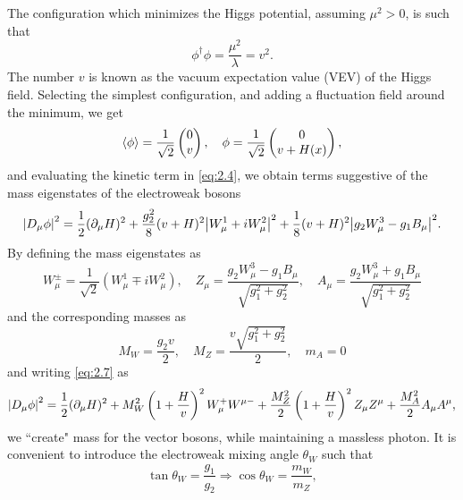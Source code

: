 The configuration which minimizes the Higgs potential, assuming $\mu^2 >0$, is such that 
\begin{equation}
    \label{eq:2.5}
    \phi^{\dagger}\phi = \frac{\mu^2}{\lambda} = v^2.
\end{equation}
The number $v$ is known as the vacuum expectation value (VEV) of the Higgs field. Selecting the simplest configuration, and adding a fluctuation field around the minimum, we get
\begin{equation}
    \label{eq:2.6}
    \expval{\phi} = \frac{1}{\sqrt{2}}\begin{pmatrix}
        0 \\ v
    \end{pmatrix}, \quad \phi = \frac{1}{\sqrt{2}}\begin{pmatrix}
        0 \\ v + H(x)
    \end{pmatrix},
\end{equation}
and evaluating the kinetic term in \eqref{eq:2.4}, we obtain terms suggestive of the mass eigenstates of the electroweak bosons
\begin{equation}
    \label{eq:2.7}
    \abs{D_{\mu}\phi} ^2 = \frac{1}{2}(\partial_{\mu}H)^2 + \frac{g_2^2}{8}(v+H)^2\abs{W_{\mu}^1 + iW_{\mu}^2}^2 + \frac{1}{8}(v+H)^2\abs{g_2W_{\mu}^3-g_1B_{\mu}}^2.
\end{equation}
By defining the mass eigenstates as
\begin{equation}
    \label{eq:2.8}
    W^{\pm}_{\mu}= \frac{1}{\sqrt{2}}(W_{\mu}^1\mp iW_{\mu}^2), \quad Z_{\mu} = \frac{g_2W_{\mu}^3-g_1B_{\mu}}{\sqrt{g_1^2+g_2^2}}, \quad A_{\mu} = \frac{g_2W_{\mu}^3 + g_1B_{\mu}}{\sqrt{g_1^2+g_2^2}}
\end{equation}
and the corresponding masses as
\begin{equation}
    \label{eq:2.9}
    M_W = \frac{g_2v}{2}, \quad M_Z = \frac{v\sqrt{g_1^2+g_2^2}}{2}, \quad m_A = 0
\end{equation}
and writing \eqref{eq:2.7} as
\begin{equation}
    \label{eq:2.10}
    \abs{D_{\mu}\phi} ^2 = \frac{1}{2}(\partial_{\mu}H)^2 + M_W^2\left(1+\frac{H}{v}\right)^2W_{\mu}^{+}W^{\mu-} + \frac{M_Z^2}{2}\left(1+\frac{H}{v}\right)^2Z_{\mu}Z^{\mu} + \frac{M_A^2}{2}A_{\mu}A^{\mu},
\end{equation}
we ``create" mass for the vector bosons, while maintaining a massless photon. It is convenient to introduce the electroweak mixing angle $\theta_W$ such that
\begin{equation}
    \label{eq:2.11}
    \tan\theta_W = \frac{g_1}{g_2} \Rightarrow \cos\theta_W = \frac{m_W}{m_Z}, 
\end{equation}
